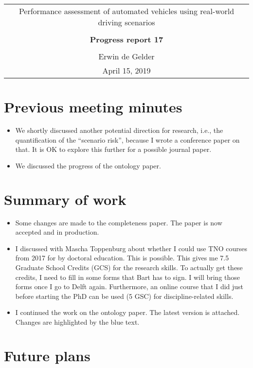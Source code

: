 \documentclass[10pt,final,a4paper,oneside,onecolumn]{article}
\newcommand{\progressreportnumber}{17}
\renewcommand{\author}{Erwin de Gelder}
\renewcommand{\date}{April 15, 2019}
\renewcommand{\title}{Performance assessment of automated vehicles using real-world driving scenarios}
\begin{document}
	
\begin{center}
	\begin{tabular}{c}
		\title \\ \\
		\textbf{\huge Progress report \progressreportnumber} \\ \\
		\author \\ 
		\date
	\end{tabular}
\end{center}

\section{Previous meeting minutes}

\begin{itemize}
	\item We shortly discussed another potential direction for research, i.e., the quantification of the ``scenario risk'', because I wrote a conference paper on that. It is OK to explore this further for a possible journal paper.
	\item We discussed the progress of the ontology paper.
\end{itemize}

\section{Summary of work}

\begin{itemize}
	\item Some changes are made to the completeness paper. The paper is now accepted and in production.
	\item I discussed with Mascha Toppenburg about whether I could use TNO courses from 2017 for by doctoral education. This is possible. This gives me 7.5 Graduate School Credits (GCS) for the research skills. To actually get these credits, I need to fill in some forms that Bart has to sign. I will bring those forms once I go to Delft again. Furthermore, an online course that I did just before starting the PhD can be used (5 GSC) for discipline-related skills.
	\item I continued the work on the ontology paper. The latest version is attached. Changes are highlighted by the blue text.
\end{itemize}

\section{Future plans}
\end{document}
